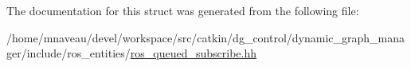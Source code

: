 The documentation for this struct was generated from the following file\+:\begin{DoxyCompactItemize}
\item 
/home/mnaveau/devel/workspace/src/catkin/dg\+\_\+control/dynamic\+\_\+graph\+\_\+manager/include/ros\+\_\+entities/\hyperlink{ros__queued__subscribe_8hh}{ros\+\_\+queued\+\_\+subscribe.\+hh}\end{DoxyCompactItemize}
